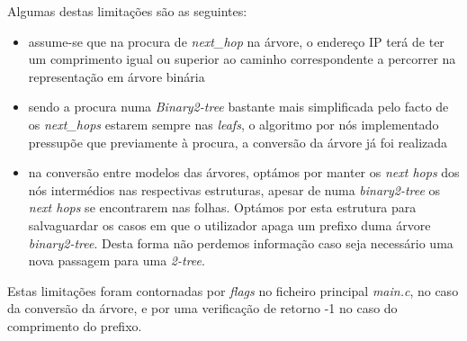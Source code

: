 \documentclass[twocolumn]{article}
\begin{document}
Algumas destas limitações são as seguintes:
\begin{itemize}
  \item assume-se que na procura de \textit{next\_hop} na árvore, o endereço IP terá de ter um comprimento igual ou superior ao caminho correspondente a percorrer na representação em árvore binária
  
  \item sendo a procura numa \textit{Binary2-tree} bastante mais simplificada pelo facto de os \textit{next\_hops} estarem sempre nas \textit{leafs}, o algoritmo por nós implementado pressupõe que previamente à procura, a conversão da árvore já foi realizada
  \item na conversão entre modelos das árvores, optámos por manter os \textit{next hops} dos nós intermédios nas respectivas estruturas, apesar de numa \textit{binary2-tree} os \textit{next hops} se encontrarem nas folhas. Optámos por esta estrutura para salvaguardar os casos em que o utilizador apaga um prefixo duma árvore \textit{binary2-tree}. Desta forma não perdemos informação caso seja necessário uma nova passagem para uma \textit{2-tree}.
  \end{itemize}
Estas limitações foram contornadas por \textit{flags} no ficheiro principal \textit{main.c}, no caso da conversão da árvore, e por uma verificação de retorno -1 no caso do comprimento do prefixo.
\end{document}

